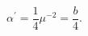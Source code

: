 \begin{equation}                              
\alpha^{'} = \frac{1}{4} \mu^{-2} = \frac{b}{4}.                       \label{eq:mina}       
\end{equation} 
